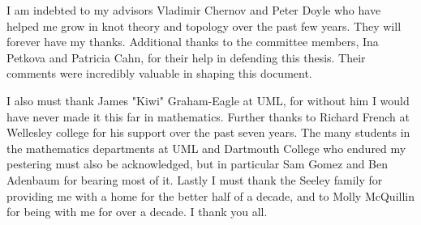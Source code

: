 I am indebted to my advisors Vladimir Chernov and Peter Doyle who have
helped me grow in knot theory and topology over the past few years. They will
forever have my thanks. Additional thanks to the committee members, Ina Petkova
and Patricia Cahn, for their help in defending this thesis. Their comments
were incredibly valuable in shaping this document.
\par\hfill\par
I also must thank James "Kiwi" Graham-Eagle at UML,
for without him I would have never made it this far in mathematics. Further
thanks to Richard French at Wellesley college for his support over the past
seven years. The many students in the mathematics departments at UML and
Dartmouth College who endured my pestering must also be acknowledged, but in
particular Sam Gomez and Ben Adenbaum for bearing most of it. Lastly I must
thank the Seeley family for providing me with a home for the better half of a
decade, and to Molly McQuillin for being with me for over a decade. I thank you
all.
